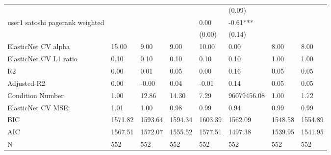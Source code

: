 \begin{table}
\begin{center}
\begin{tabular}{llllllll}
                                               &         &         &         &         & (0.09)      &           &          \\
user1 satoshi pagerank weighted                &         &         &         & 0.00    & -0.61***    &           &          \\
                                               &         &         &         & (0.00)  & (0.14)      &           &          \\
ElasticNet CV alpha                            & 15.00   & 9.00    & 9.00    & 10.00   & 0.00        & 8.00      & 8.00     \\
ElasticNet CV  L1 ratio                        & 0.10    & 0.10    & 0.10    & 0.10    & 0.10        & 1.00      & 1.00     \\
R2                                             & 0.00    & 0.01    & 0.05    & 0.00    & 0.16        & 0.05      & 0.05     \\
Adjusted-R2                                    & 0.00    & -0.00   & 0.04    & -0.01   & 0.14        & 0.05      & 0.05     \\
Condition Number                               & 1.00    & 12.86   & 14.30   & 7.29    & 96079456.08 & 1.00      & 1.72     \\
ElasticNet CV MSE:                             & 1.01    & 1.00    & 0.98    & 0.99    & 0.94        & 0.99      & 0.99     \\
BIC                                            & 1571.82 & 1593.64 & 1594.34 & 1603.39 & 1562.09     & 1548.58   & 1554.89  \\
AIC                                            & 1567.51 & 1572.07 & 1555.52 & 1577.51 & 1497.38     & 1539.95   & 1541.95  \\
N                                              & 552     & 552     & 552     & 552     & 552         & 552       & 552      \\
\hline
\end{tabular}
\end{center}
\end{table}
